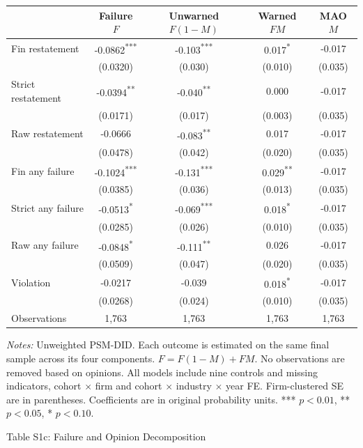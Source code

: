 \documentclass[10pt]{article}
\newcommand{\sym}[1]{\textsuperscript{#1}}
\begin{document}
\begin{tabular*}{\textwidth}{@{\extracolsep{\fill}}lcccc@{}}
\toprule
 & Failure $F$ & Unwarned $F(1-M)$ & Warned $FM$ & MAO $M$ \\
\midrule
Fin restatement & -0.0862\sym{***} & -0.103\sym{***} & 0.017\sym{*} & -0.017 \\
 & (0.0320) & (0.030) & (0.010) & (0.035) \\
Strict restatement & -0.0394\sym{**} & -0.040\sym{**} & 0.000 & -0.017 \\
 & (0.0171) & (0.017) & (0.003) & (0.035) \\
Raw restatement & -0.0666 & -0.083\sym{**} & 0.017 & -0.017 \\
 & (0.0478) & (0.042) & (0.020) & (0.035) \\
Fin any failure & -0.1024\sym{***} & -0.131\sym{***} & 0.029\sym{**} & -0.017 \\
 & (0.0385) & (0.036) & (0.013) & (0.035) \\
Strict any failure & -0.0513\sym{*} & -0.069\sym{***} & 0.018\sym{*} & -0.017 \\
 & (0.0285) & (0.026) & (0.010) & (0.035) \\
Raw any failure & -0.0848\sym{*} & -0.111\sym{**} & 0.026 & -0.017 \\
 & (0.0509) & (0.047) & (0.020) & (0.035) \\
Violation & -0.0217 & -0.039 & 0.018\sym{*} & -0.017 \\
 & (0.0268) & (0.024) & (0.010) & (0.035) \\
\midrule
Observations & 1,763 & 1,763 & 1,763 & 1,763 \\
\bottomrule\end{tabular*}
\medskip\par\fontsize{9}{11}\selectfont
\textit{Notes:} Unweighted PSM-DID. Each outcome is estimated on the same final sample across its four components. $F=F(1-M)+FM$. No observations are removed based on opinions. All models include nine controls and missing indicators, cohort $\times$ firm and cohort $\times$ industry $\times$ year FE. Firm-clustered SE are in parentheses. Coefficients are in original probability units. *** $p<0.01$, ** $p<0.05$, * $p<0.10$.
\par\fontsize{10}{12}\selectfont
\clearpage
\begin{center}\large Table S1c: Failure and Opinion Decomposition\end{center}
\end{document}
